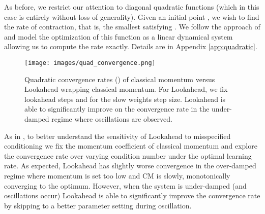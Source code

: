 \documentclass{article}
\begin{document}
As before, we restrict our attention to diagonal quadratic functions (which in this case is entirely without loss of generality). Given an initial point , we wish to find the rate of contraction, that is, the smallest  satisfying . We follow the approach of \citep{o2015adaptive} and model the optimization of this function as a linear dynamical system allowing us to compute the rate exactly. Details are in Appendix \ref{app:quadratic}.

\begin{wrapfigure}{r}{0.6 \textwidth}
    \centering
    \vspace{-0.2cm}
    \texttt{[image: images/quad\_convergence.png]}
    \vspace{-0.2cm}
    \caption{Quadratic convergence rates () of classical momentum versus Lookahead wrapping classical momentum. For Lookahead, we fix  lookahead steps and  for the slow weights step size. Lookahead is able to significantly improve on the convergence rate in the under-damped regime where oscillations are observed.}
    \label{fig:quad_convergence}
\end{wrapfigure}

As in \citet{lucas2018aggregated}, to better understand the sensitivity of Lookahead to misspecified conditioning we fix the momentum coefficient of classical momentum and explore the convergence rate over varying condition number under the optimal learning rate.
As expected, Lookahead has slightly worse convergence in the over-damped regime where momentum is set too low and CM is slowly, monotonically converging to the optimum. However, when the system is under-damped (and oscillations occur) Lookahead is able to significantly improve the convergence rate by skipping to a better parameter setting during oscillation.
\end{document}
